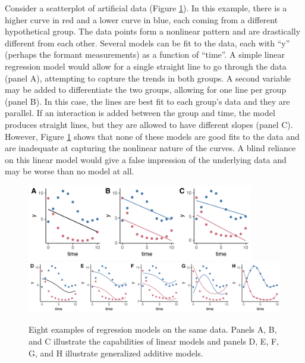Consider a scatterplot of artificial data (Figure \ref{fig:illustrative_gamms}). In this example, there is a higher curve in red and a lower curve in blue, each coming from a different hypothetical group. The data points form a nonlinear pattern and are drastically different from each other. Several models can be fit to the data, each with ``y'' (perhaps the formant measurements) as a function of ``time''. A simple linear regression model would allow for a single straight line to go through the data (panel A), attempting to capture the trends in both groups. A second variable may be added to differentiate the two groups, allowing for one line per group (panel B). In this case, the lines are best fit to each group’s data and they are parallel. If an interaction is added between the group and time, the model produces straight lines, but they are allowed to have different slopes (panel C). However, Figure \ref{fig:illustrative_gamms} shows that none of these models are good fits to the data and are inadequate at capturing the nonlinear nature of the curves. A blind reliance on this linear model would give a false impression of the underlying data and may be worse than no model at all.

\begin{figure}
    \centering
    \includegraphics[width=3.9in, left]{Figures/methods/lm_plots.pdf}
    \includegraphics[width = 6.5in]{Figures/methods/gam_plots.pdf}
    \caption[Eight examples of regression models on the same data.]{Eight examples of regression models on the same data. Panels A, B, and C illustrate the capabilities of linear models and panels D, E, F, G, and H illustrate generalized additive models.}
    \label{fig:illustrative_gamms}
\end{figure}

